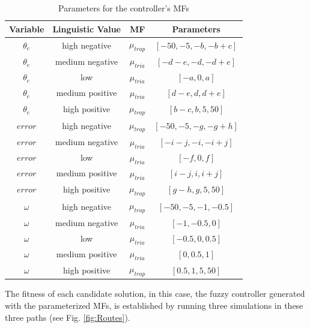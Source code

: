 \documentclass[runningheads]{llncs}
\begin{document}
\begin{table}[htbp] \caption{ Parameters for the controller's MFs}
    \label{tab:mfs} \centering
    \begin{tabular}{cccc}
    \hline
     \textbf{Variable} & \textbf{Linguistic Value} & \textbf{MF}& \textbf{Parameters}  \\
    \hline
    $\theta_e$ & high negative  & $\mu_{trap}$  & $[-50, -5, -b, -b+c]$     \\ 
    $\theta_e$ & medium negative& $\mu_{tria}$  & $[-d-e, -d, -d+e]$     \\ 
    $\theta_e$ & low            & $\mu_{tria}$  & $[-a, 0, a]$     \\ 
    $\theta_e$ & medium positive& $\mu_{tria}$  & $[d-e, d, d+e]$     \\ 
    $\theta_e$ & high positive  & $\mu_{trap}$  & $[b-c, b, 5, 50]$ \\

    \hline
    $error$ & high negative  & $\mu_{trap}$  & $[-50, -5, -g, -g+h]$     \\ 
    $error$ & medium negative& $\mu_{tria}$  & $[-i-j, -i, -i+j]$     \\ 
    $error$ & low            & $\mu_{tria}$  & $[-f, 0, f]$     \\ 
    $error$ & medium positive& $\mu_{tria}$  & $[i-j, i, i+j]$     \\ 
    $error$ & high positive  & $\mu_{trap}$  & $[g-h, g, 5, 50]$ \\

    \hline
    $\omega$ & high negative  & $\mu_{trap}$  & $[-50, -5, -1, -0.5]$     \\ 
    $\omega$ & medium negative& $\mu_{tria}$  & $[-1, -0.5, 0]$     \\ 
    $\omega$ & low            & $\mu_{tria}$  & $[-0.5, 0, 0.5]$     \\ 
    $\omega$ & medium positive& $\mu_{tria}$  & $[0, 0.5,1]$     \\ 
    $\omega$ & high positive  & $\mu_{trap}$  & $[0.5, 1 ,5, 50]$     \\ 
    \hline
\end{tabular}
\end{table}

The fitness of each candidate solution, in this case, the fuzzy controller
generated with the parameterized MFs, is established by running three
simulations in these three paths (see Fig. \ref{fig:Routes}).
\end{document}
